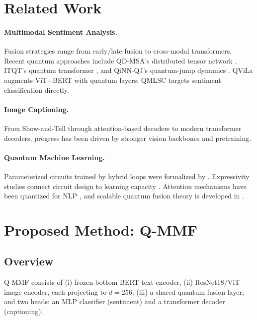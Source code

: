 \documentclass[11pt]{article}
\begin{document}
\section{Related Work}
\label{sec:related}

\paragraph{Multimodal Sentiment Analysis.}
Fusion strategies range from early/late fusion to cross-modal transformers.
Recent quantum approaches include QD-MSA's distributed tensor network
\citep{li2025qdmsa}, ITQT's quantum transformer \citep{itqt2025}, and
QiNN-QJ's quantum-jump dynamics \citep{qinn2025}. QViLa \citep{mukesh2024qvila}
augments ViT+BERT with quantum layers; QMLSC \citep{qmlsc2025} targets
sentiment classification directly.

\paragraph{Image Captioning.}
From Show-and-Tell \citep{vinyals2015show} through attention-based decoders to
modern transformer decoders, progress has been driven by stronger vision
backbones and pretraining.

\paragraph{Quantum Machine Learning.}
Parameterized circuits trained by hybrid loops were formalized by
\citet{bergholm2018pennylane}. Expressivity studies connect circuit design to
learning capacity \citep{cong2019qcnn, chen2024qmcl}. Attention mechanisms have
been quantized for NLP \citep{yadla2025vqc, tomal2025qattn}, and scalable
quantum fusion theory is developed in \citet{nguyen2025qfl}.

\section{Proposed Method: Q-MMF}
\label{sec:method}

\subsection{Overview}
Q-MMF consists of (i) frozen-bottom BERT text encoder, (ii) ResNet18/ViT image
encoder, each projecting to $d{=}256$; (iii) a shared quantum fusion layer;
and two heads: an MLP classifier (sentiment) and a transformer decoder
(captioning).
\end{document}
